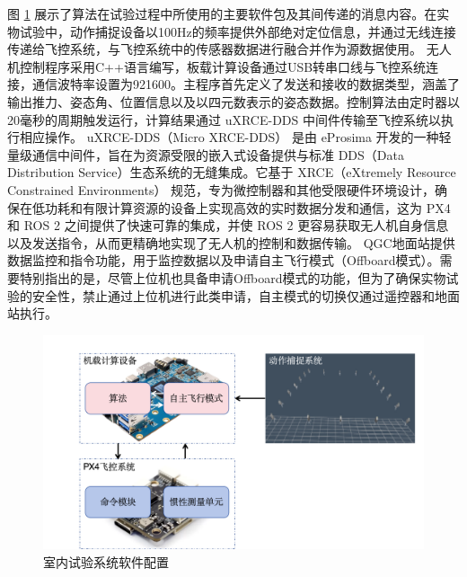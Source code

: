 \documentclass[lang=chs, degree=master, blindreview=false, winfonts=true]{yanputhesis}
\begin{document}
图 \ref{framewor} 展示了算法在试验过程中所使用的主要软件包及其间传递的消息内容。在实物试验中，动作捕捉设备以100Hz的频率提供外部绝对定位信息，并通过无线连接传递给飞控系统，与飞控系统中的传感器数据进行融合并作为源数据使用。
无人机控制程序采用C++语言编写，板载计算设备通过USB转串口线与飞控系统连接，通信波特率设置为921600。主程序首先定义了发送和接收的数据类型，涵盖了输出推力、姿态角、位置信息以及以四元数表示的姿态数据。控制算法由定时器以20毫秒的周期触发运行，计算结果通过 uXRCE-DDS 中间件传输至飞控系统以执行相应操作。
uXRCE-DDS（Micro XRCE-DDS） 是由 eProsima 开发的一种轻量级通信中间件，旨在为资源受限的嵌入式设备提供与标准 DDS（Data Distribution Service）生态系统的无缝集成。它基于 XRCE（eXtremely Resource Constrained Environments） 规范，专为微控制器和其他受限硬件环境设计，确保在低功耗和有限计算资源的设备上实现高效的实时数据分发和通信，这为 PX4 和 ROS 2 之间提供了快速可靠的集成，并使 ROS 2 更容易获取无人机自身信息以及发送指令，从而更精确地实现了无人机的控制和数据传输。
QGC地面站提供数据监控和指令功能，用于监控数据以及申请自主飞行模式（Offboard模式）。需要特别指出的是，尽管上位机也具备申请Offboard模式的功能，但为了确保实物试验的安全性，禁止通过上位机进行此类申请，自主模式的切换仅通过遥控器和地面站执行。
\begin{figure}[hbt!]
	\centering
	\includegraphics[width=38pc]{picture/5_9.png} 
	\caption{室内试验系统软件配置} 
	\label{framewor}
\end{figure}




\end{document}
